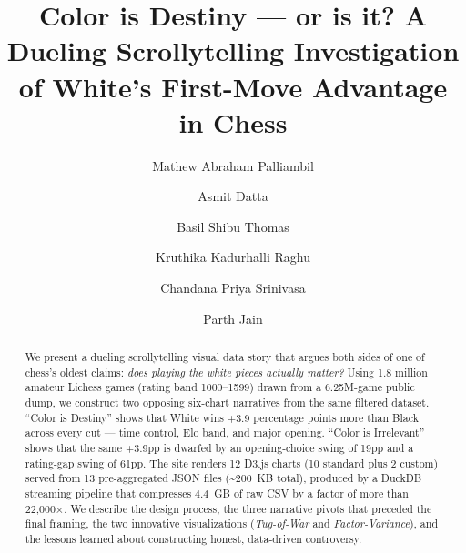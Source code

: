 \documentclass[sigconf,nonacm,natbib=false]{acmart}
\begin{document}
\title{Color is Destiny --- or is it? A Dueling Scrollytelling
Investigation of White's First-Move Advantage in Chess}

\author{Mathew Abraham Palliambil}

\author{Asmit Datta}

\author{Basil Shibu Thomas}

\author{Kruthika Kadurhalli Raghu}

\author{Chandana Priya Srinivasa}

\author{Parth Jain}

\renewcommand{\shortauthors}{Palliambil et al.}

\begin{abstract}
We present a dueling scrollytelling visual data story that argues
both sides of one of chess's oldest claims: \emph{does playing the
white pieces actually matter?} Using 1.8 million amateur Lichess games
(rating band 1000--1599) drawn from a 6.25M-game public dump, we
construct two opposing six-chart narratives from the same filtered
dataset. ``Color is Destiny'' shows that White wins +3.9 percentage
points more than Black across every cut --- time control, Elo band,
and major opening. ``Color is Irrelevant'' shows that the same +3.9pp
is dwarfed by an opening-choice swing of 19pp and a rating-gap swing
of 61pp. The site renders 12 D3.js charts (10 standard plus 2 custom)
served from 13 pre-aggregated JSON files (\textasciitilde 200~KB total),
produced by a DuckDB streaming pipeline that compresses 4.4~GB of raw
CSV by a factor of more than 22{,}000$\times$. We describe the design
process, the three narrative pivots that preceded the final framing,
the two innovative visualizations (\emph{Tug-of-War} and
\emph{Factor-Variance}), and the lessons learned about constructing
honest, data-driven controversy.
\end{abstract}
\end{document}

